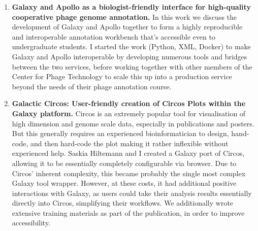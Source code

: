 \begin{enumerate}[label=\ref{chapter:annotation}.\arabic*]
\itemsep-0.5em
\setcounter{enumi}{-1}
\item \textbf{Galaxy and Apollo as a biologist-friendly interface for high-quality cooperative phage genome annotation.} In this work we discuss the development of Galaxy and Apollo together to form a highly reproducible and interoperable annotation workbench that's accessible even to undergraduate students. I started the work (Python, XML, Docker) to make Galaxy and Apollo interoperable by developing numerous tools and bridges between the two services, before working together with other members of the Center for Phage Technology to scale this up into a production service beyond the needs of their phage annotation course.

\item \textbf{Galactic Circos: User-friendly creation of Circos Plots within the Galaxy platform.} Circos is an extremely popular tool for visualisation of high dimension and genome scale data, especially in publications and posters. But this generally requires an experienced bioinformatician to design, hand-code, and then hard-code the plot making it rather inflexible without experienced help. Saskia Hiltemann and I created a Galaxy port of Circos, allowing it to be essentially completely configurable via browser. Due to Circos' inherent complexity, this became probably the single most complex Galaxy tool wrapper. However, at these costs, it had additional positive interactions with Galaxy, as users could take their analysis results essentially directly into Circos, simplifying their workflows. We additionally wrote extensive training materials as part of the publication, in order to improve accessibility.

\end{enumerate}
